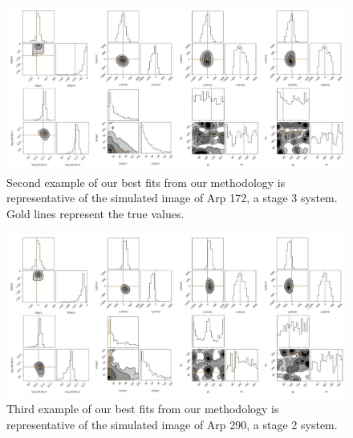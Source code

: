 \begin{figure}
    \centering
    \includegraphics[width=\textwidth]{Chapter1/figures/Arp172-red-corner.pdf}
    \caption[Second example of our best fits from our methodology is representative of the simulated image of Arp 172, a stage 3 system.]{Second example of our best fits from our methodology is representative of the simulated image of Arp 172, a stage 3 system. Gold lines represent the true values.}
    \label{fig:best-Arp172}
\end{figure}

\begin{figure}
    \centering
    \includegraphics[width=\textwidth]{Chapter1/figures/Arp290-red-corner.pdf}
    \caption[Third example of our best fits from our methodology is representative of the simulated image of Arp 290, a stage 2 system.]{Third example of our best fits from our methodology is representative of the simulated image of Arp 290, a stage 2 system.}
    \label{fig:best-Arp290}
\end{figure}

